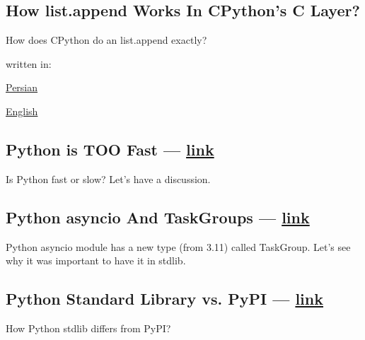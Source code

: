 \begin{multicols}{2}
\subsection{{How list.append Works In CPython's C Layer?}}
\begin{zitemize}
\item How does CPython do an {\ttfamily list.append} exactly?
\item written in:
\begin{zitemize}
\item \href{https://virgool.io/@liewpl/how-append-works-gp4apwtpr0bt}{Persian}
\item \href{https://medium.com/@mahdihaghverdi/how-list-append-is-implemented-in-c-layer-of-cpython-interpreter-bf88632819c0}{English}
\end{zitemize}
\end{zitemize}

\subsection{{Python is TOO Fast --- \href{https://virgool.io/@liewpl/python-is-very-fast-gmmdjs3zyhob}{link}}}
\begin{zitemize}
\item Is Python fast or slow? Let's have a discussion.
\end{zitemize}

\subsection{{Python asyncio And TaskGroups --- \href{https://virgool.io/@liewpl/asyncio-and-taskgroups-t598c8poken9}{link}}}
\begin{zitemize}
\item Python {\ttfamily asyncio} module has a new type (from 3.11) called {\ttfamily TaskGroup}. Let's see why it was important to have it in stdlib.
\end{zitemize}

\subsection{{Python Standard Library vs. PyPI --- \href{https://virgool.io/@liewpl/asyncio-and-taskgroups-t598c8poken9}{link}}}
\begin{zitemize}
\item How Python stdlib differs from PyPI?
\end{zitemize}


\end{multicols}
